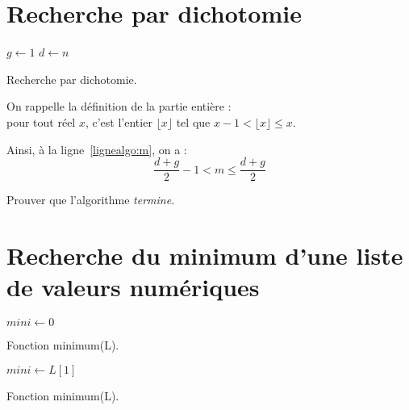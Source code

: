 \section{Recherche par dichotomie}

\begin{algorithm}[H]
$g \leftarrow 1$ \;
$d \leftarrow n$ \;
\caption{Recherche par dichotomie.}
\label{algo:recherchetantquedicho}
\end{algorithm}

On rappelle la définition de la partie entière :\\
pour tout réel $x$, c'est l'entier $\lfloor x \rfloor$ tel que $ x-1 < \lfloor x \rfloor \leq x$. 

Ainsi, à la ligne~\ref{lignealgo:m}, on a : $$ \frac{d+g}{2} - 1 < m \leq \frac{d+g}{2}$$

Prouver que l'algorithme \textit{termine}.

\section{Recherche du minimum d'une liste de valeurs numériques}
\label{sec:RechercheMinimum}

\begin{algorithm}[H]
$mini \leftarrow 0$ \;

\caption{Fonction minimum(L).}
\label{algo:recherche1}
\end{algorithm}

\begin{algorithm}[H]
$mini \leftarrow L[1]$ \;
\caption{Fonction minimum(L).}
\label{algo:recherche2}
\end{algorithm}


